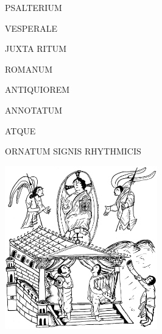 \documentclass[12pt]{article} %
\begin{document}


\vspace*{35 pt}

\begin{center}

\color{benred8}

{\fontsize{2.660cm}{5 em}\selectfont

PSALTERIUM

}

\vspace*{15 pt}

{\fontsize{2.975cm}{5 em}\selectfont

VESPERALE

}

\vspace*{20 pt}

{\fontsize{1.5cm}{1 em}\selectfont

JUXTA RITUM

\vspace*{2.7 mm}

ROMANUM

\vspace*{5 mm}

ANTIQUIOREM

}

\vspace*{10 mm}

\begin{Huge}

ANNOTATUM

\end{Huge}\begin{Large}

ATQUE

\vspace*{-1.0 mm}

\end{Large}\begin{Huge}

ORNATUM SIGNIS RHYTHMICIS

\end{Huge}

\vspace*{3 mm}

\includegraphics[height=7.06cm]{CoverImage02_s.png}


\end{center}
\end{document}
